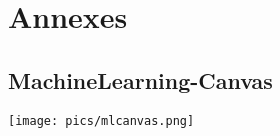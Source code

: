 \chapter{Annexes}

\section{MachineLearning-Canvas}
\label{onepager}
\begin{center}
\texttt{[image: pics/mlcanvas.png]} 
\end{center}

